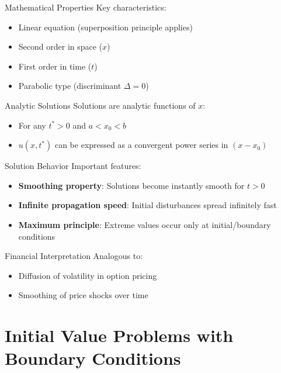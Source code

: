 \documentclass{beamer}
\begin{document}
\begin{frame}{Mathematical Properties}
    Key characteristics:
    \begin{itemize}
        \item Linear equation (superposition principle applies)
        \item Second order in space ($x$)
        \item First order in time ($t$)
        \item Parabolic type (discriminant $\Delta = 0$)
    \end{itemize}
    
    \begin{block}{Analytic Solutions}
        Solutions are analytic functions of $x$:
        \begin{itemize}
            \item For any $t^* > 0$ and $a < x_0 < b$
            \item $u(x,t^*)$ can be expressed as a convergent power series in $(x-x_0)$
        \end{itemize}
    \end{block}
\end{frame}

\begin{frame}{Solution Behavior}
    Important features:
    \begin{itemize}
        \item \textbf{Smoothing property}: Solutions become instantly smooth for $t>0$
        \item \textbf{Infinite propagation speed}: Initial disturbances spread infinitely fast
        \item \textbf{Maximum principle}: Extreme values occur only at initial/boundary conditions
    \end{itemize}
    
    \begin{alertblock}{Financial Interpretation}
        Analogous to:
        \begin{itemize}
            \item Diffusion of volatility in option pricing
            \item Smoothing of price shocks over time
        \end{itemize}
    \end{alertblock}
\end{frame}


\section{Initial Value Problems with Boundary Conditions}
\end{document}
